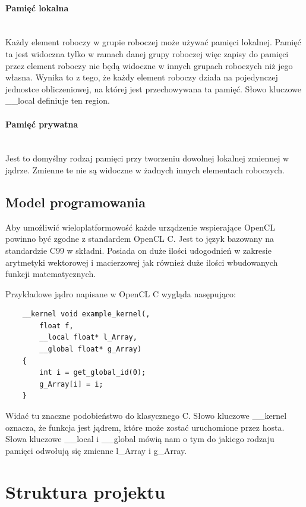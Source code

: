 \documentclass[polish, 12pt]{aghthesis}
\begin{document}
	\paragraph{Pamięć lokalna}\ \\
		Każdy element roboczy w grupie roboczej może używać pamięci lokalnej. Pamięć ta jest widoczna tylko w ramach danej grupy roboczej więc zapisy do pamięci przez element roboczy nie będą widoczne w innych grupach roboczych niż jego własna. Wynika to z tego, że każdy element roboczy działa na pojedynczej jednostce obliczeniowej, na której jest przechowywana ta pamięć. Słowo kluczowe \_\_local definiuje ten region.
	\paragraph{Pamięć prywatna}\ \\
		Jest to domyślny rodzaj pamięci przy tworzeniu dowolnej lokalnej zmiennej w jądrze. Zmienne te nie są widoczne w żadnych innych elementach roboczych.
	
	\subsection{Model programowania}
	Aby umożliwić wieloplatformowość każde urządzenie wspierające OpenCL powinno być zgodne z standardem OpenCL C. Jest to język bazowany na standardzie C99 w składni. Posiada on duże ilości udogodnień w zakresie arytmetyki wektorowej i macierzowej jak również duże ilości wbudowanych funkcji matematycznych.
	
	Przykładowe jądro napisane w OpenCL C wygląda nasępująco:
	
	\begin{lstlisting}
	__kernel void example_kernel(,
		float f,
		__local float* l_Array,
		__global float* g_Array)
	{
		int i = get_global_id(0);
		g_Array[i] = i;
	}
	\end{lstlisting}
	
	Widać tu znaczne podobieństwo do klasycznego C. Słowo kluczowe \_\_kernel oznacza, że funkcja jest jądrem, które może zostać uruchomione przez hosta. Słowa kluczowe \_\_local i \_\_global mówią nam o tym do jakiego rodzaju pamięci odwołują się zmienne l\_Array i g\_Array.

\section{Struktura projektu}
\end{document}
